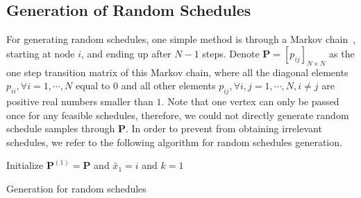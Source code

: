 \subsection{Generation of Random Schedules}
For generating random schedules, one simple method is through a Markov chain~\cite{MarkovRandomSchedule}, starting at node $i$, and ending up after $N-1$ steps.
Denote $\mathbf{P} = [p_{ij}]_{N \times N}$ as the one step transition matrix of this Markov chain, where all the diagonal elements ${p_{ii}, \forall i = 1, \cdots, N}$ equal to $0$ and all other elements ${p_{ij}, \forall i,j = 1,\cdots,N, i \neq j}$ are positive real numbers smaller than $1$.
Note that one vertex can only be passed once for any feasible schedules, therefore, we could not directly generate random schedule samples through $\mathbf{P}$.
In order to prevent from obtaining irrelevant schedules, we refer to the following algorithm for random schedules generation.
%
\IncMargin{1em}
\begin{algorithm}[]
 \SetAlgoLined
 \BlankLine
 Initialize $\mathbf{P}^{(1)} = \mathbf{P}$ and $\tilde{x_1}=i$ and $k=1$ \\
 \caption{\label{alg::generateSchedule}Generation for random schedules}
\end{algorithm}
\DecMargin{1em}

